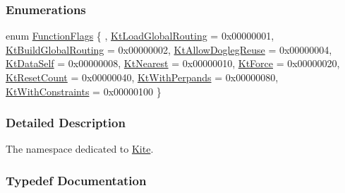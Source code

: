 \subsubsection*{Enumerations}
\begin{DoxyCompactItemize}
\item 
enum \hyperlink{namespaceKite_acca8fffa3182dea5f94208f454f14b47}{Function\+Flags} \{ , \newline
\hyperlink{namespaceKite_acca8fffa3182dea5f94208f454f14b47abd49be7700e04e255b30a6cee68535fd}{Kt\+Load\+Global\+Routing} = 0x00000001, 
\newline
\hyperlink{namespaceKite_acca8fffa3182dea5f94208f454f14b47a0441a09d569a7634f9d1826fa315ddcc}{Kt\+Build\+Global\+Routing} = 0x00000002, 
\newline
\hyperlink{namespaceKite_acca8fffa3182dea5f94208f454f14b47a766f453d6caa06490196a952762f0bb8}{Kt\+Allow\+Dogleg\+Reuse} = 0x00000004, 
\newline
\hyperlink{namespaceKite_acca8fffa3182dea5f94208f454f14b47a68e917ff37d4b5cef906303181836404}{Kt\+Data\+Self} = 0x00000008, 
\newline
\hyperlink{namespaceKite_acca8fffa3182dea5f94208f454f14b47afaf04b2ddbae58557683c20373c0bada}{Kt\+Nearest} = 0x00000010, 
\newline
\hyperlink{namespaceKite_acca8fffa3182dea5f94208f454f14b47a5d7da665ec1368b29ee9d3e382cd1072}{Kt\+Force} = 0x00000020, 
\newline
\hyperlink{namespaceKite_acca8fffa3182dea5f94208f454f14b47aeb3b2254e460ac48ce9a57965ba3627b}{Kt\+Reset\+Count} = 0x00000040, 
\newline
\hyperlink{namespaceKite_acca8fffa3182dea5f94208f454f14b47a8f9c41816abe8ac1da87d930bc12ed5e}{Kt\+With\+Perpands} = 0x00000080, 
\newline
\hyperlink{namespaceKite_acca8fffa3182dea5f94208f454f14b47abffa3499a9376f3e9f1de1ab6b8ba37b}{Kt\+With\+Constraints} = 0x00000100
 \}
\end{DoxyCompactItemize}


\subsubsection{Detailed Description}
The namespace dedicated to \hyperlink{namespaceKite}{Kite}. 

\subsubsection{Typedef Documentation}
\mbox{\label{namespaceKite_ac86883c8d5a0f34ab9b4ec6eaaad6c9f}} 
